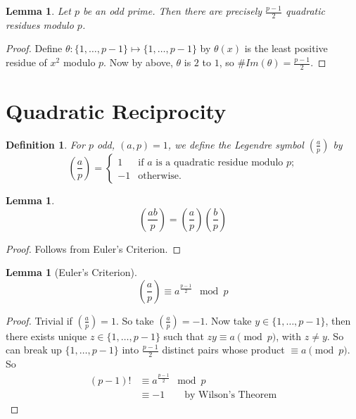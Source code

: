 \documentclass{notes}
\theoremstyle{plain}
\newtheorem{definition}[theorem]{Definition}
\newtheorem{lemma}[theorem]{Lemma}
\newcommand{\legsym}[2]{\left( \frac{#1}{#2} \right)}
\begin{document}
\begin{lemma}
  Let $p$ be an odd prime.  Then there are precisely $\frac{p-1}{2}$
  quadratic residues modulo $p$.
\end{lemma}

\begin{proof}
  Define $\theta : \{1, \dots ,p-1 \} \mapsto \{1, \dots , p-1 \}$ by
  $\theta(x)$ is the least positive residue of $x^2$ modulo $p$.  Now
  by above, $\theta$ is $2$ to $1$, so $\#Im(\theta) = \frac{p-1}{2}$.
\end{proof}

\section{Quadratic Reciprocity}

\begin{definition}
  For $p$ odd, $(a,p)=1$, we define the Legendre symbol
  $\legsym{a}{p}$ by
\[
\legsym{a}{p} =
\begin{cases}
  1       & \text{if $a$ is a quadratic residue modulo $p$;} \\
  -1 & \text{otherwise.}
\end{cases}
\]
\end{definition}

\begin{lemma}
\[
\legsym{ab}{p}=\legsym{a}{p}\legsym{b}{p}
\]
\end{lemma}

\begin{proof}
  Follows from Euler's Criterion.
\end{proof}

\begin{lemma}[Euler's Criterion]
\[
\legsym{a}{p} \equiv a^{\frac{p-1}{2}} \mod{p}
\]
\end{lemma}

\begin{proof}
  Trivial if $\legsym{a}{p}=1$.  So take $\legsym{a}{p}=-1$.  Now take
  $y \in \{1, \dots, p-1 \}$, then there exists unique $z \in \{1,
  \dots, p-1\}$ such that $zy \equiv a \pmod{p}$, with $z \ne y$.  So
  can break up $\{1, \dots, p-1 \}$ into $\frac{p-1}{2}$ distinct
  pairs whose product $\equiv a \pmod{p}$.  So
\begin{align*}
  (p-1)! &\equiv a^{\frac{p-1}{2}} \mod{p} \\
  &\equiv -1 \qquad \text{by Wilson's Theorem}
\end{align*}
\end{proof}
\end{document}
